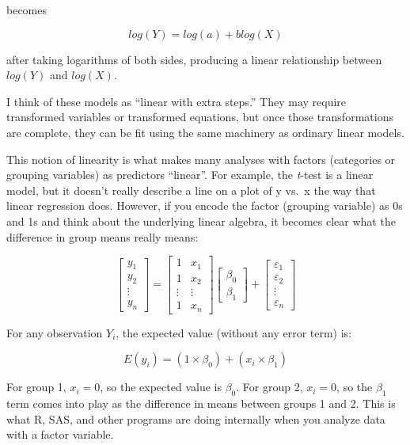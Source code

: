 \documentclass[
  13,
  letterpaper,
]{report}
\begin{document}
becomes

\[log\left(Y\right)=log\left(a\right)+blog\left(X\right)\]

after taking logarithms of both sides, producing a linear relationship
between \(log\left(Y\right)\) and \(log\left(X\right)\).

I think of these models as ``linear with extra steps.'' They may require
transformed variables or transformed equations, but once those
transformations are complete, they can be fit using the same machinery
as ordinary linear models.

This notion of linearity is what makes many analyses with factors
(categories or grouping variables) as predictors ``linear''. For
example, the \emph{t}-test is a linear model, but it doesn't really
describe a line on a plot of y vs.~x the way that linear regression
does. However, if you encode the factor (grouping variable) as 0s and 1s
and think about the underlying linear algebra, it becomes clear what the
difference in group means really means:

\[
\begin{bmatrix}
y_1\\
y_2\\
\vdots\\
y_n
\end{bmatrix}
=
\begin{bmatrix}
1 & x_1\\
1 & x_2\\
\vdots & \vdots\\
1 & x_n
\end{bmatrix}
\begin{bmatrix}
\beta_0\\
\beta_1
\end{bmatrix}
+
\begin{bmatrix}
\varepsilon_1\\
\varepsilon_2\\
\vdots\\
\varepsilon_n
\end{bmatrix}
\]

For any observation \(Y_i\), the expected value (without any error term)
is:

\[E\left(y_i\right)=\left(1\times\beta_0\right)+\left(x_i\times\beta_1\right)\]

For group 1, \(x_i = 0\), so the expected value is \(\beta_0\). For
group 2, \(x_i = 0\), so the \(\beta_1\) term comes into play as the
difference in means between groups 1 and 2. This is what R, SAS, and
other programs are doing internally when you analyze data with a factor
variable.
\end{document}
